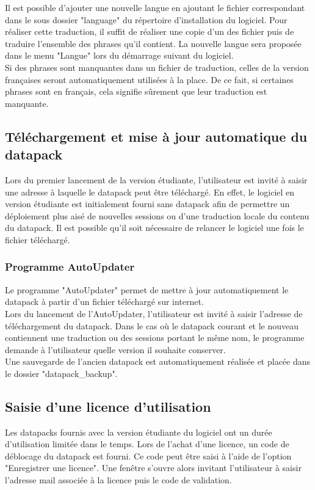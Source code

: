 Il est possible d'ajouter une nouvelle langue en ajoutant le fichier correspondant dans le sous dossier "language" du répertoire d'installation du logiciel. Pour réaliser cette traduction, il suffit de réaliser une copie d'un des fichier puis de traduire l'ensemble des phrases qu'il contient. La nouvelle langue sera proposée dans le menu "Langue" lors du démarrage suivant du logiciel.\\

Si des phrases sont manquantes dans un fichier de traduction, celles de la version françaises seront automatiquement utilisées à la place. De ce fait, si certaines phrases sont en français, cela signifie sûrement que leur traduction est manquante. 

\subsection{Téléchargement et mise à jour automatique du datapack}
Lors du premier lancement de la version étudiante, l'utilisateur est invité à saisir une adresse à laquelle le datapack peut être téléchargé. En effet, le logiciel en version étudiante est initialement fourni sans datapack afin de permettre un déploiement plus aisé de nouvelles sessions ou d'une traduction locale du contenu du datapack. Il est possible qu'il soit nécessaire de relancer le logiciel une fois le fichier téléchargé.\\

\subsubsection{Programme AutoUpdater}
Le programme "AutoUpdater" permet de mettre à jour automatiquement le datapack à partir d'un fichier téléchargé sur internet.\\

Lors du lancement de l'AutoUpdater, l'utilisateur est invité à saisir l'adresse de téléchargement du datapack. Dans le cas où le datapack courant et le nouveau contiennent une traduction ou des sessions portant le même nom, le programme demande à l'utilisateur quelle version il souhaite conserver.\\

Une sauvegarde de l'ancien datapack est automatiquement réalisée et placée dans le dossier "datapack\_backup".



\subsection{Saisie d'une licence d'utilisation}
Les datapacks fournis avec la version étudiante du logiciel ont un durée d'utilisation limitée dans le temps. Lors de l'achat d'une licence, un code de déblocage du datapack est fourni. Ce code peut être saisi à l'aide de l'option "Enregistrer une licence". Une fenêtre s'ouvre alors invitant l'utilisateur à saisir l'adresse mail associée à la licence puis le code de validation.\\

